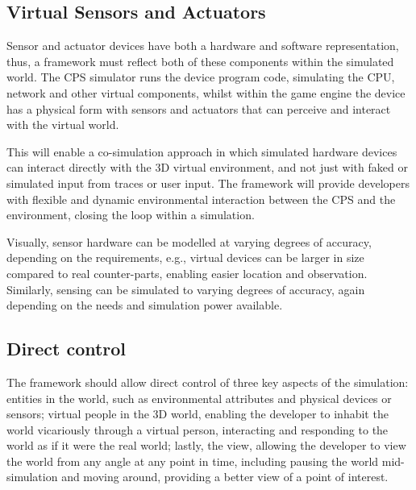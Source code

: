 \subsection{Virtual Sensors and Actuators}
\label{sub:requirements_Virtual Sensors and Actuators}
Sensor and actuator devices have both a hardware and software representation, thus, a framework must reflect both of these components within the simulated world. The CPS simulator runs the device program code, simulating the CPU, network and other virtual components, whilst within the game engine the device has a physical form with sensors and actuators that can perceive and interact with the virtual world. 

This will enable a co-simulation approach in which simulated hardware devices can interact directly with the 3D virtual environment, and not just with faked or simulated input from traces or user input. The framework will provide developers with flexible and dynamic environmental interaction between the CPS and the environment, closing the loop within a simulation. 

Visually, sensor hardware can be modelled at varying degrees of accuracy, depending on the requirements, e.g., virtual devices can be larger in size compared to real counter-parts, enabling easier location and observation. Similarly, sensing can be simulated to varying degrees of accuracy, again depending on the needs and simulation power available. 


\subsection{Direct control}
\label{sub:requirements_direct_control}
The framework should allow direct control of three key aspects of the simulation: entities in the world, such as environmental attributes and physical devices or sensors; virtual people in the 3D world, enabling the developer to inhabit the world vicariously through a virtual person, interacting and responding to the world as if it were the real world; lastly, the view, allowing the developer to view the world from any angle at any point in time, including pausing the world mid-simulation and moving around, providing a better view of a point of interest.

